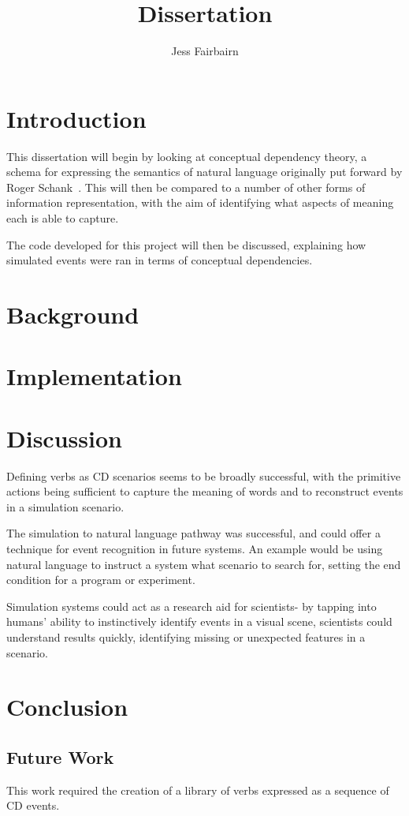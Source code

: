\documentclass{article}
\author{Jess Fairbairn}
\title{Dissertation}
\begin{document}
    \maketitle
    \tableofcontents
    \section{Introduction}
    This dissertation will begin by looking at conceptual dependency theory, a schema for expressing the semantics of natural language originally put forward by Roger Schank~\cite{SCHANK1972552}. This will then be compared to a number of other forms of information representation, with the aim of identifying what aspects of meaning each is able to capture.

    The code developed for this project will then be discussed, explaining how simulated events were ran in terms of conceptual dependencies. 

    \section{Background}
    
    

    \section{Implementation}
    
    


    \section{Discussion}
    Defining verbs as CD scenarios seems to be broadly successful, with the primitive actions being sufficient to capture the meaning of words and to reconstruct events in a simulation scenario.

    The simulation to natural language pathway was successful, and could offer a technique for event recognition in future systems. An example would be using natural language to instruct a system what scenario to search for, setting the end condition for a program or experiment.

    Simulation systems could act as a research aid for scientists- by tapping into humans' ability to instinctively identify events in a visual scene, scientists could understand results quickly, identifying missing or unexpected features in a scenario.

    \section{Conclusion}
    \subsection{Future Work}
    This work required the creation of a library of verbs expressed as a sequence of CD events.

    
    
\end{document}
